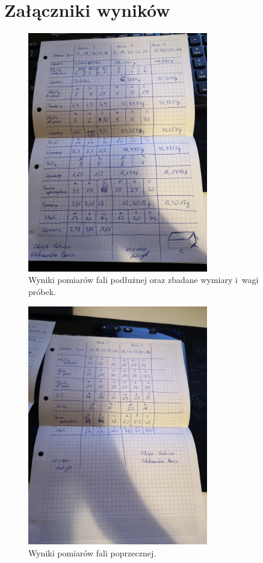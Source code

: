 \documentclass[a4paper,12pt]{article}
\begin{document}
\section{Załączniki wyników}

\begin{figure}[H]
    \centering
    \includegraphics[width=0.7\textwidth]{img/fala_podluzna.jpg}
    \caption{Wyniki pomiarów fali podłużnej oraz zbadane wymiary i~wagi próbek.}
\end{figure}

\begin{figure}[H]
    \centering
    \includegraphics[width=0.7\textwidth]{img/fala_poprzeczna.jpg}
    \caption{Wyniki pomiarów fali poprzecznej.}
\end{figure}
\end{document}
